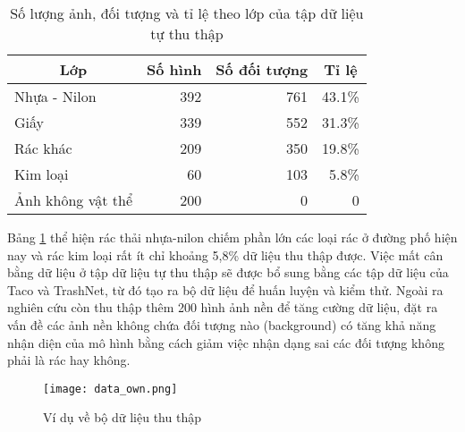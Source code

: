 \documentclass[../the.tex]{subfiles}
\begin{document}
\begin{table}[!ht]
	\centering
	\caption{Số lượng ảnh, đối tượng và tỉ lệ theo lớp của tập dữ liệu tự thu thập}
	\begin{tabular}{|l|r|r|r|}
		\hline
		\multicolumn{1}{|c|}{\textbf{Lớp}}
		                  & \multicolumn{1}{c|}{\textbf{Số hình}}
		                  & \multicolumn{1}{c|}{\textbf{Số đối tượng}}
		                  & \multicolumn{1}{c|}{\textbf{Tỉ lệ}}
		\\
		\hline

		Nhựa - Nilon      & 392                                      & 761 & 43.1\% \\
		\hline

		Giấy              & 339                                      & 552 & 31.3\% \\
		\hline

		Rác khác          & 209                                      & 350 & 19.8\% \\
		\hline

		Kim loại          & 60                                       & 103 & 5.8\%  \\
		\hline
		Ảnh không vật thể & 200                                      & 0   & 0      \\
		\hline
	\end{tabular}

	\label{tab:datasetown}
\end{table}

{\fontsize{13}{12} \selectfont

Bảng \ref{tab:datasetown} thể hiện rác thải nhựa-nilon chiếm phần lớn các loại rác ở đường phố hiện nay và rác kim loại rất ít chỉ khoảng 5,8\% dữ liệu thu thập được.
Việc mất cân bằng dữ liệu ở tập dữ liệu tự thu thập sẽ được bổ sung bằng các tập dữ liệu của Taco và TrashNet, từ đó tạo ra bộ dữ liệu để huấn luyện và kiểm thử.
Ngoài ra nghiên cứu còn thu thập thêm 200 hình ảnh nền để tăng cường dữ liệu, đặt ra vấn đề các ảnh nền không chứa đối tượng nào (background) có tăng khả năng nhận diện của mô hình bằng cách giảm việc nhận dạng sai các đối tượng không phải là rác hay không.

}


\begin{figure}[H]
	\centering
	\texttt{[image: data\_own.png]}
	\caption{Ví dụ về bộ dữ liệu thu thập}
	\label{fig:dataset_own}
\end{figure}
\end{document}
